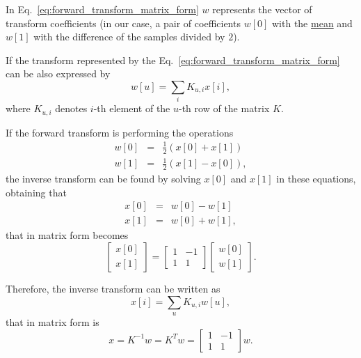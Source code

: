 In Eq.~\ref{eq:forward_transform_matrix_form} $w$ represents the
vector of transform coefficients (in our case, a pair of coefficients
$w[0]$ with the
\href{https://en.wikipedia.org/wiki/Arithmetic_mean}{mean} and $w[1]$
with the difference of the samples divided by $2$).

If the transform represented by the Eq.~\ref{eq:forward_transform_matrix_form} can be
also expressed by
\begin{equation}
  w[u] = \sum_i K_{u,i}x[i],
  \label{eq:forward_transform_linear_combination_form}
\end{equation}
where $K_{u,i}$ denotes $i$-th element of the $u$-th row of the matrix
$K$.

If the forward transform is performing the operations
\begin{equation*}
  \begin{array}{rcl}
  w[0] & = & \frac{1}{2}(x[0] + x[1])\\
  w[1] & = & \frac{1}{2}(x[1] - x[0]),
  \end{array}
\end{equation*}
the inverse transform can be found by solving $x[0]$ and $x[1]$ in
these equations, obtaining that
\begin{equation*}
  \begin{array}{rcl}
  x[0] & = & w[0] - w[1]\\
  x[1] & = & w[0] + w[1],
  \end{array}
\end{equation*}
that in matrix form becomes
\begin{equation*}
  \begin{bmatrix}
    x[0] \\
    x[1]
  \end{bmatrix}
  = 
  \begin{bmatrix} 1 & -1 \\ 1 & 1 \end{bmatrix}
  \begin{bmatrix}
    w[0] \\
    w[1]
  \end{bmatrix}.
\end{equation*}

Therefore, the inverse transform can be written as
\begin{equation}
  x[i] = \sum_u K_{u,i}w[u],
  \label{eq:inverse_transform_linear_combination_form}
\end{equation}
that in matrix form is
\begin{equation}
  x = K^{-1}w = K^Tw = \begin{bmatrix} 1 & -1 \\ 1 & 1 \end{bmatrix}w.
  \label{eq:inverse_transform_matrix_form}
\end{equation}

